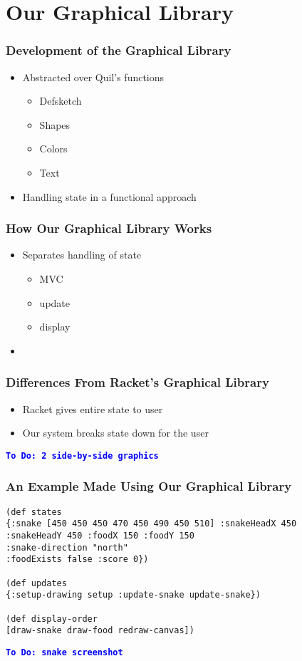 \documentclass{beamer}
\newcommand{\comment}[1]{{\bf \tt  {#1}}}
\newcommand{\todo}[1]{\textcolor{blue}{\comment{To Do: {#1}}}}
\begin{document}
\section{Our Graphical Library}

\begin{frame}
\frametitle{Development of the Graphical Library}
\begin{itemize}
\item Abstracted over Quil's functions
	\begin{itemize}
	\item Defsketch
	\item Shapes
	\item Colors
	\item Text
	\end{itemize}
\item Handling state in a functional approach
\end{itemize}
\end{frame}


\begin{frame}
\frametitle{How Our Graphical Library Works}
\begin{itemize}
\item Separates handling of state
	\begin{itemize}
	\item MVC
	\item update
	\item display
	\end{itemize}
\item 
\end{itemize}
\end{frame}


\begin{frame}
\frametitle{Differences From Racket's Graphical Library}
\begin{itemize}
\item Racket gives entire state to user
\item Our system breaks state down for the user
\end{itemize}
\todo{2 side-by-side graphics}
\end{frame}

\begin{frame} [fragile]
\frametitle{An Example Made Using Our Graphical Library}
\begin{verbatim}
(def states
{:snake [450 450 450 470 450 490 450 510] :snakeHeadX 450
:snakeHeadY 450 :foodX 150 :foodY 150 
:snake-direction "north"
:foodExists false :score 0})

(def updates
{:setup-drawing setup :update-snake update-snake})

(def display-order
[draw-snake draw-food redraw-canvas])
\end{verbatim}
\todo{snake screenshot}
\end{frame}
\end{document}
